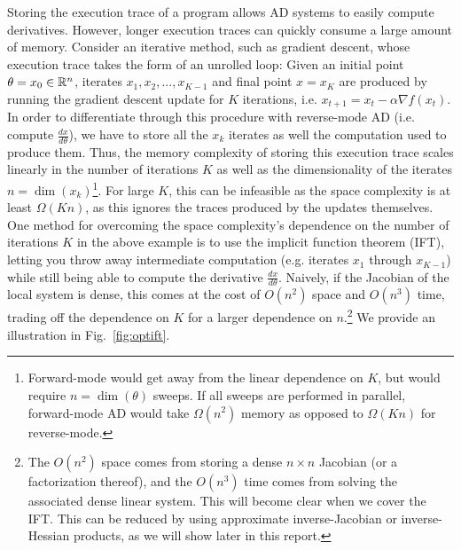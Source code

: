 \documentclass[11pt]{article}
\begin{document}
Storing the execution trace of a program allows AD systems to easily compute derivatives.
However, longer execution traces can quickly consume a large amount of memory.
Consider an iterative method, such as gradient descent,
whose execution trace takes the form of an unrolled loop:
Given an initial point $\theta = x_0\in\mathbb{R}^n$,
iterates $x_1, x_2, ..., x_{K-1}$ and final point $x=x_K$
are produced by running the gradient descent
update for $K$ iterations, i.e. $x_{t+1} = x_{t} - \alpha \nabla f(x_t)$.
In order to differentiate through this procedure with reverse-mode AD
(i.e. compute $\frac{dx}{d\theta}$),
we have to store all the $x_k$ iterates
as well the computation used to produce them.
Thus, the memory complexity of storing this execution trace scales linearly in the
number of iterations $K$ as well as the dimensionality of the iterates $n=\dim(x_k)$\footnote{
Forward-mode would get away from the linear dependence on $K$,
but would require $n=\dim(\theta)$ sweeps.
If all sweeps are performed in parallel,
forward-mode AD would take $\Omega(n^2)$ memory as opposed to $\Omega(Kn)$ for reverse-mode.
}.
For large $K$, this can be infeasible as the space complexity is at least $\Omega(Kn)$,
as this ignores the traces produced by the updates themselves.
One method for overcoming the space complexity's dependence on the number of iterations $K$ in
the above example is to use the implicit function theorem (IFT),
letting you throw away intermediate computation (e.g. iterates $x_1$ through $x_{K-1}$)
while still being able to compute the derivative $\frac{dx}{d\theta}$.
Naively, if the Jacobian of the local system is dense, this comes at the cost of
$O(n^2)$ space and $O(n^3)$ time,
trading off the dependence on $K$ for a larger dependence on $n$.\footnote{
The $O(n^2)$ space comes from storing a dense $n\times n$ Jacobian
(or a factorization thereof),
and the $O(n^3)$ time comes from solving the associated dense linear system.
This will become clear when we cover the IFT.
This can be reduced by using approximate inverse-Jacobian or inverse-Hessian products,
as we will show later in this report.
}
We provide an illustration in Fig.~\ref{fig:optift}.
\end{document}
